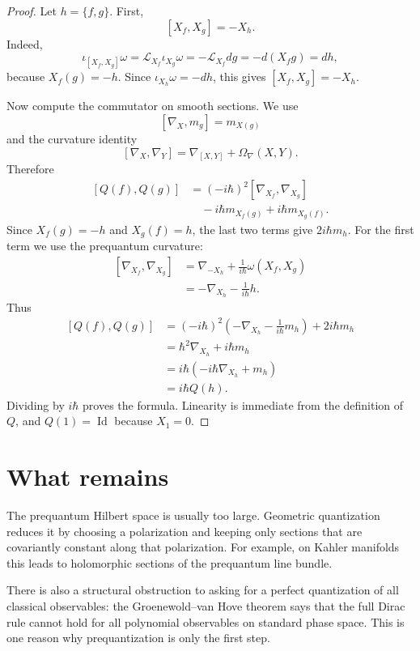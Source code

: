 \begin{proof}
Let $h=\{f,g\}$.  First,
$$
{}[X_f,X_g]=-X_h.
$$
Indeed,
$$
\iota_{[X_f,X_g]}\omega
=\mathcal L_{X_f}\iota_{X_g}\omega
=-\mathcal L_{X_f}dg
=-d(X_fg)=dh,
$$
because $X_f(g)=-h$.  Since
$\iota_{X_h}\omega=-dh$, this gives
$[X_f,X_g]=-X_h$.

Now compute the commutator on smooth
sections.  We use
$$
{}[\nabla_X,m_g]=m_{X(g)}
$$
and the curvature identity
$$
{}[\nabla_X,\nabla_Y]
=\nabla_{[X,Y]}+\Omega_\nabla(X,Y).
$$
Therefore
$$
\begin{aligned}
{}[Q(f),Q(g)]
&=(-i\hbar)^2[\nabla_{X_f},\nabla_{X_g}]\\
&\quad -i\hbar m_{X_f(g)}
+i\hbar m_{X_g(f)}.
\end{aligned}
$$
Since $X_f(g)=-h$ and $X_g(f)=h$, the last
two terms give $2i\hbar m_h$.  For the
first term we use the prequantum curvature:
$$
\begin{aligned}
{}[\nabla_{X_f},\nabla_{X_g}]
&=\nabla_{-X_h}
+\frac{1}{i\hbar}\omega(X_f,X_g)\\
&=-\nabla_{X_h}-\frac{1}{i\hbar}h.
\end{aligned}
$$
Thus
$$
\begin{aligned}
{}[Q(f),Q(g)]
&=(-i\hbar)^2
\left(-\nabla_{X_h}
-\frac{1}{i\hbar}m_h\right)
+2i\hbar m_h\\
&=\hbar^2\nabla_{X_h}+i\hbar m_h\\
&=i\hbar(-i\hbar\nabla_{X_h}+m_h)\\
&=i\hbar Q(h).
\end{aligned}
$$
Dividing by $i\hbar$ proves the formula.
Linearity is immediate from the definition of
$Q$, and $Q(1)=\operatorname{Id}$ because
$X_1=0$.
\end{proof}

\section{What remains}
\label{section-what-remains}

\noindent
The prequantum Hilbert space is usually too
large.  Geometric quantization reduces it by
choosing a polarization and keeping only
sections that are covariantly constant along
that polarization.  For example, on Kahler
manifolds this leads to holomorphic sections
of the prequantum line bundle.

\medskip\noindent
There is also a structural obstruction to
asking for a perfect quantization of all
classical observables: the Groenewold--van
Hove theorem says that the full Dirac rule
cannot hold for all polynomial observables on
standard phase space.  This is one reason why
prequantization is only the first step.






